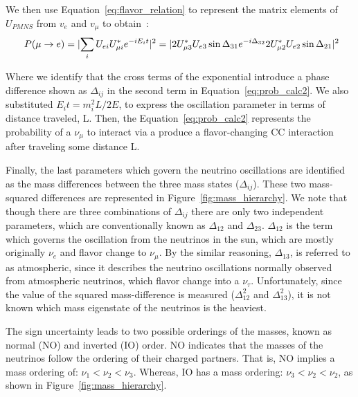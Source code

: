We then use Equation~\ref{eq:flavor_relation} to represent the matrix elements of $U_{PMNS}$ from $v_{e}$ and $v_{\mu}$ to obtain~\citep{Nunokawa_2008}:
\begin{equation}~\label{eq:prob_calc2}
  P(\mu \rightarrow e)
  = \lvert \sum_{i} U_{e i} U^{*}_{\mu i} e^{-i E_{i}t} \rvert^{2} \\
  = \lvert 2U^{*}_{\mu 3}U_{e3}\sin \Delta_{31}e^{-i\Delta_{32}} 2U^{*}_{\mu 2}U_{e2}\sin \Delta_{21} \rvert^{2}
\end{equation}

Where we identify that the cross terms of the exponential introduce a phase difference shown as $\Delta_{ij}$ in the second term in Equation~\ref{eq:prob_calc2}.
We also substituted $E_{i}t = m^{2}_{i}L/2E$, to express the oscillation parameter in terms of distance traveled, L.
Then, the Equation~\ref{eq:prob_calc2} represents the probability of a $\nu_{\mu}$ to interact via a produce a flavor-changing CC interaction after traveling some distance L.

Finally, the last parameters which govern the neutrino oscillations are identified as the mass differences between the three mass states ($\Delta_{ij}$).
These two mass-squared differences are represented in Figure~\ref{fig:mass_hierarchy}.
We note that though there are three combinations of $\Delta_{ij}$ there are only two independent parameters, which are conventionally known as $\Delta_{12}$ and $\Delta_{23}$.
$\Delta_{12}$ is the term which governs the oscillation from the neutrinos in the sun, which are mostly originally $\nu_{e}$ and flavor change to $\nu_{\mu}$.
By the similar reasoning, $\Delta_{13}$, is referred to as atmospheric, since it describes the neutrino oscillations normally observed from atmospheric neutrinos, which flavor change into a $\nu_{\tau}$.
Unfortunately, since the value of the squared mass-difference is measured ($\Delta_{12}^{2}$ and $\Delta_{13}^{2}$), it is not known which mass eigenstate of the neutrinos is the heaviest.

The sign uncertainty leads to two possible orderings of the masses, known as normal (NO) and inverted (IO) order.
NO indicates that the masses of the neutrinos follow the ordering of their charged partners.
That is, NO implies a mass ordering of: $\nu_{1} < \nu_{2} < \nu_{3}$.
Whereas, IO has a mass ordering: $\nu_{3} < \nu_{2} < \nu_{2}$, as shown in Figure~\ref{fig:mass_hierarchy}.

